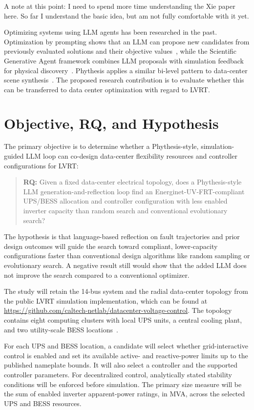 \documentclass[11pt,a4paper]{article}
\begin{document}
A note at this point: I need to spend more time understanding the Xie paper here. So far I understand the basic idea, but am not fully comfortable with it yet.

Optimizing systems using LLM agents has been researched in the past. Optimization by prompting shows that an LLM can propose new candidates from previously evaluated solutions and their objective values~\cite{yang2024opro}, while the Scientific Generative Agent framework combines LLM proposals with simulation feedback for physical discovery~\cite{ma2024sga}. Phythesis applies a similar bi-level pattern to data-center scene synthesis~\cite{li2026phythesis}. The proposed research contribution is to evaluate whether this can be transferred to data center optimization with regard to LVRT.

\section{Objective, RQ, and Hypothesis}

The primary objective is to determine whether a Phythesis-style, simulation-guided LLM loop can co-design data-center flexibility resources and controller configurations for LVRT:

\begin{quote}
    \textbf{RQ:} Given a fixed data-center electrical topology, does a Phythesis-style LLM generation-and-reflection loop find an Energinet-UV-FRT-compliant UPS/BESS allocation and controller configuration with less enabled inverter capacity than random search and conventional evolutionary search?
\end{quote}

The hypothesis is that language-based reflection on fault trajectories and prior design outcomes will guide the search toward compliant, lower-capacity configurations faster than conventional design algorithms like random sampling or evolutionary search. A negative result still would show that the added LLM does not improve the search compared to a conventional optimizer.

The study will retain the 14-bus system and the radial data-center topology from the public LVRT simulation implementation, which can be found at \url{https://github.com/caltech-netlab/datacenter-voltage-control}. The topology contains eight computing clusters with local UPS units, a central cooling plant, and two utility-scale BESS locations~\cite{xie2026lvrt}.

For each UPS and BESS location, a candidate will select whether grid-interactive control is enabled and set its available active- and reactive-power limits up to the published nameplate bounds. It will also select a controller and the supported controller parameters. For decentralized control, analytically stated stability conditions will be enforced before simulation. The primary size measure will be the sum of enabled inverter apparent-power ratings, in MVA, across the selected UPS and BESS resources.
\end{document}
